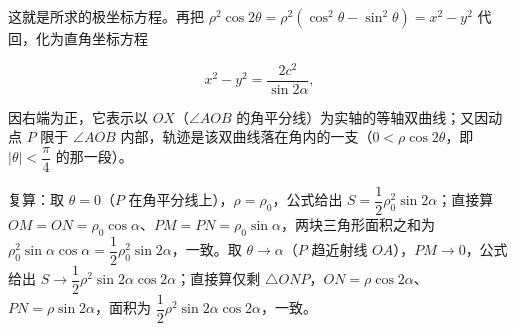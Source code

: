 \begin{answer}
这就是所求的极坐标方程。再把 $\rho^2\cos2\theta=\rho^2(\cos^2\theta-\sin^2\theta)=x^2-y^2$ 代回，化为直角坐标方程

\nopagebreak[4]
\[
x^2-y^2=\frac{2c^2}{\sin2\alpha},
\]

因右端为正，它表示以 $OX$（$\angle AOB$ 的角平分线）为实轴的等轴双曲线；又因动点 $P$ 限于 $\angle AOB$ 内部，轨迹是该双曲线落在角内的一支（$0<\rho\cos2\theta$，即 $\lvert\theta\rvert<\dfrac\pi4$ 的那一段）。

复算：取 $\theta=0$（$P$ 在角平分线上），$\rho=\rho_0$，公式给出 $S=\dfrac12\rho_0^2\sin2\alpha$；直接算 $OM=ON=\rho_0\cos\alpha$、$PM=PN=\rho_0\sin\alpha$，两块三角形面积之和为 $\rho_0^2\sin\alpha\cos\alpha=\dfrac12\rho_0^2\sin2\alpha$，一致。取 $\theta\to\alpha$（$P$ 趋近射线 $OA$），$PM\to0$，公式给出 $S\to\dfrac12\rho^2\sin2\alpha\cos2\alpha$；直接算仅剩 $\triangle ONP$，$ON=\rho\cos2\alpha$、$PN=\rho\sin2\alpha$，面积为 $\dfrac12\rho^2\sin2\alpha\cos2\alpha$，一致。


\end{answer}
